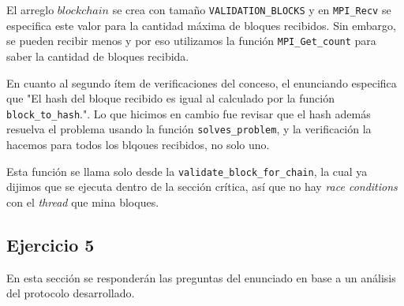 \documentclass[10pt, a4paper, hidelinks]{article}
\begin{document}
El arreglo $blockchain$ se crea con tamaño \texttt{VALIDATION_BLOCKS} y en \texttt{MPI\_Recv} se especifica este valor para la cantidad máxima de bloques recibidos. Sin embargo, se pueden recibir menos y por eso utilizamos la función \texttt{MPI_Get_count} para saber la cantidad de bloques recibida. 

En cuanto al segundo ítem de verificaciones del conceso, el enunciando especifica que "El hash del bloque recibido es igual al calculado por la función \texttt{block\_to\_hash}.". Lo que hicimos en cambio fue revisar que el hash además resuelva el problema usando la función \texttt{solves\_problem}, y la verificación la hacemos para todos los blqoues recibidos, no solo uno.

Esta función se llama solo desde la \texttt{validate\_block\_for\_chain}, la cual ya dijimos que se ejecuta dentro de la sección crítica, así que no hay \textit{race conditions} con el \textit{thread} que mina bloques.

\subsection{Ejercicio 5}
En esta sección se responderán las preguntas del enunciado en base a un análisis del protocolo desarrollado.
\end{document}
